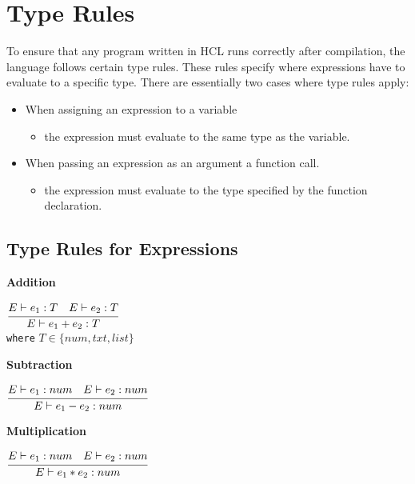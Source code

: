 \section{Type Rules}
To ensure that any program written in HCL runs correctly after compilation, the language follows certain type rules.
These rules specify where expressions have to evaluate to a specific type.
There are essentially two cases where type rules apply:
\begin{itemize}
	\item When assigning an expression to a variable
	\begin{itemize}
		\item the expression must evaluate to the same type as the variable.
	\end{itemize}
	\item When passing an expression as an argument a function call.
	\begin{itemize}
		\item the expression must evaluate to the type specified by the function declaration.
	\end{itemize}
\end{itemize}


\subsection{Type Rules for Expressions}
\textbf{Addition}\\
\begin{center}
	\begin{math}
	\cfrac
	{E \vdash e_1: T \quad E \vdash e_2: T}
	{E \vdash e_1 + e_2 : T}
	\end{math}\\[1\baselineskip]
	\texttt{where} $T \in \{num, txt, list\}$
\end{center}

\textbf{Subtraction}\\
\begin{center}
	\begin{math}
	\cfrac
	{E \vdash e_1: num \quad E \vdash e_2: num}
	{E \vdash e_1 - e_2 : num}
	\end{math}
\end{center}

\textbf{Multiplication}\\
\begin{center}
	\begin{math}
	\cfrac
	{E \vdash e_1: num \quad E \vdash e_2: num}
	{E \vdash e_1 * e_2 : num}
	\end{math}
\end{center}

